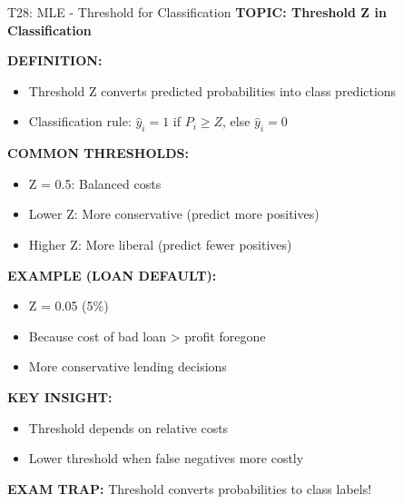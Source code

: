 \documentclass[8pt]{beamer}
\begin{document}
	\begin{frame}{T28: MLE - Threshold for Classification}
		\fontsize{6.5}{7.5}\selectfont
		\textbf{TOPIC: Threshold Z in Classification}
		
		\vspace{0.1cm}
		\textbf{DEFINITION:}
		\begin{itemize}
			\item Threshold Z converts predicted probabilities into class predictions
			\item Classification rule: $\hat{y}_i = 1$ if $P_i \geq Z$, else $\hat{y}_i = 0$
		\end{itemize}
		
		\vspace{0.1cm}
		\textbf{COMMON THRESHOLDS:}
		\begin{itemize}
			\item \textcolor{myblue}{Z = 0.5:} Balanced costs
			\item \textcolor{myblue}{Lower Z:} More conservative (predict more positives)
			\item \textcolor{myblue}{Higher Z:} More liberal (predict fewer positives)
		\end{itemize}
		
		\vspace{0.1cm}
		\textbf{EXAMPLE (LOAN DEFAULT):}
		\begin{itemize}
			\item Z = 0.05 (5\%)
			\item Because cost of bad loan > profit foregone
			\item More conservative lending decisions
		\end{itemize}
		
		\vspace{0.1cm}
		\textbf{KEY INSIGHT:}
		\begin{itemize}
			\item Threshold depends on relative costs
			\item Lower threshold when false negatives more costly
		\end{itemize}
		
		\textcolor{myred}{\textbf{EXAM TRAP:}} Threshold converts \textcolor{myblue}{probabilities to class labels}!
	\end{frame}
	
\end{document}
